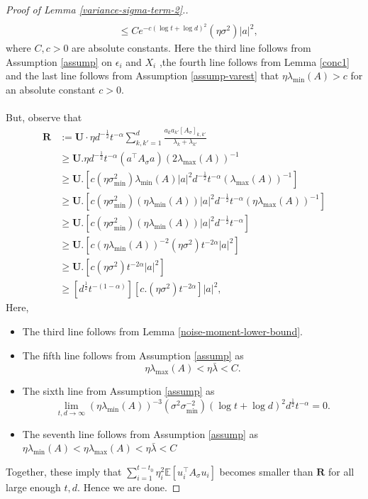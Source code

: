\documentclass[11pt, reqno,english]{amsart}
\begin{document}
\begin{proof}[Proof of Lemma \ref{variance-sigma-term-2}.]
\begin{align*}
    \\
    &\leq Ce^{-c(\log t + \log d)^2} (\eta \sigma^2)|a|^2,
\end{align*}
where $C, c > 0$ are absolute constants. Here the third line follows from Assumption \ref{assump} on $\epsilon_i$ and $X_i$ ,the fourth line follows from Lemma \ref{conc1} and the last line follows from Assumption \ref{assump-varest} that $\eta \lambda_{\min}(A) > c$ for an absolute constant $c > 0$. 
\\\\
But, observe that
\begin{align*}
\mathbf{R} &:= \mathbf{U}\cdot\eta d^{-\frac{1}{2}}t^{-\alpha}\sum_{k,k' = 1}^d \frac{a_k a_{k'}[A_{\sigma}]_{k,k'}}{\lambda_k + \lambda_{k'}}
\\
&\geq \mathbf{U}. \eta d^{-\frac{1}{2}}t^{-\alpha} (a^\top A_{\sigma} a) (2 \lambda_{\max}(A))^{-1}
\\
&\geq \mathbf{U}. [c(\eta\sigma^2_{\min})\lambda_{\min}(A) |a|^2d^{-\frac{1}{2}} t^{-\alpha} (\lambda_{\max}(A))^{-1}]
\\
&\geq \mathbf{U}. [c(\eta\sigma^2_{\min})(\eta\lambda_{\min}(A)) |a|^2d^{-\frac{1}{2}} t^{-\alpha} (\eta\lambda_{\max}(A))^{-1}]
\\
&\geq \mathbf{U}. [c(\eta\sigma^2_{\min})(\eta\lambda_{\min}(A)) |a|^2d^{-\frac{1}{2}} t^{-\alpha}]
\\
&\geq \mathbf{U}. [c (\eta \lambda_{\min}(A))^{-2} (\eta \sigma^2)t^{-2\alpha}|a|^2]
\\
&\geq \mathbf{U}.[c(\eta \sigma^2)t^{-2\alpha}|a|^2]
\\
&\geq [d^{\frac{1}{2}}t^{-(1 - \alpha)}][c.(\eta \sigma^2)t^{-2\alpha}]|a|^2,
\end{align*}
Here,
\begin{itemize}
    \item The third line follows from Lemma \ref{noise-moment-lower-bound}.
    \item  The fifth line follows from Assumption \ref{assump} as $$\eta \lambda_{\max}(A) < \eta \bar{\lambda} < C.$$
    \item The sixth line from Assumption \ref{assump} as
    $$\lim\limits_{t,d \to \infty} (\eta \lambda_{\min}(A))^{-3} (\sigma^2\sigma^{-2}_{\min})(\log t + \log d)^2d^{\frac{1}{2}}t^{-\alpha} = 0.$$
    \item The seventh line follows from Assumption \ref{assump} as $\eta \lambda_{\min}(A) < \eta \lambda_{\max}(A) < \eta \bar{\lambda} < C$
\end{itemize}
Together, these imply that $\sum_{i = 1}^{t-t_0}\eta^2_i\mathbb{E}[u^\top_i A_{\sigma}u_i]$ becomes smaller than $\mathbf{R}$ for all large enough $t,d$. Hence we are done. 
\end{proof}
\end{document}
